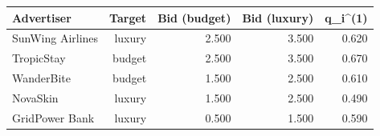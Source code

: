 \begin{tabular}{lrrrr}
\hline
Advertiser & Target & Bid (budget) & Bid (luxury) & q_i^(1) \\
\hline
SunWing Airlines & luxury & 2.500 & 3.500 & 0.620 \\
TropicStay & budget & 2.500 & 3.500 & 0.670 \\
WanderBite & budget & 1.500 & 2.500 & 0.610 \\
NovaSkin & luxury & 1.500 & 2.500 & 0.490 \\
GridPower Bank & luxury & 0.500 & 1.500 & 0.590 \\
\hline
\end{tabular}
